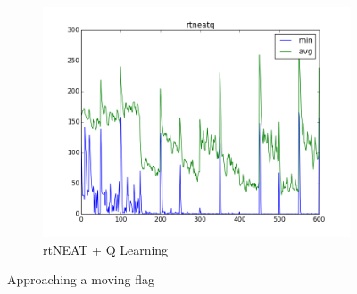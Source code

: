 \documentclass[letterpaper]{article}
\begin{document}
\begin{figure}[ht]
\begin{subfigure}{0.7\columnwidth}
  \includegraphics[width=\columnwidth]{moving_rtneatq.png}
  \caption{rtNEAT + Q Learning}
  \label{fig:moving_neatq}
\end{subfigure}
\caption{Approaching a moving flag}
\label{fig:moving}
\end{figure}
\end{document}
